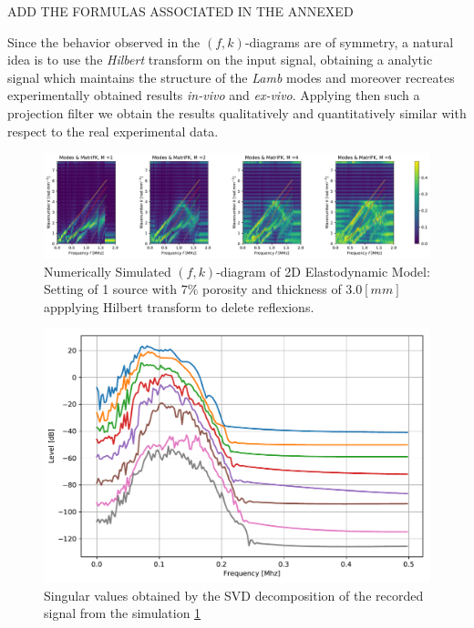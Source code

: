 ADD THE FORMULAS ASSOCIATED IN THE ANNEXED


Since the behavior observed in the $(f,k)$-diagrams are of symmetry, a natural idea is to use the \textit{Hilbert} transform on the input signal, obtaining a analytic signal which maintains the structure of the \textit{Lamb} modes and moreover recreates experimentally obtained results \textit{in-vivo} and \textit{ex-vivo}.
Applying then such a projection filter we obtain the results qualitatively and quantitatively similar with respect to the real experimental data.

\begin{figure}[!h]
	\centering
	\includegraphics[width=\textwidth]{images/TimeSingSous/2DTimeHilb_P7ElasticFK30M1460_y.pdf}
	\caption{Numerically Simulated $(f,k)$-diagram of 2D Elastodynamic Model: Setting of 1 source with $7\%$ porosity and thickness of $3.0 [mm]$ appplying Hilbert transform to delete reflexions.}
	\label{FK-Hil-DiagramS1P7M30}
\end{figure} 

\begin{figure}[!h]
	\centering
	\includegraphics[scale=.5]{images/TimeSingSous/2DTimeHilb_P7Elastic30_SV.pdf}
	\caption{Singular values obtained by the SVD decomposition of the recorded signal from the simulation \ref{FK-Hil-DiagramS1P7M30}}
	\label{SVD-Hil-S1P7M30}
\end{figure}

